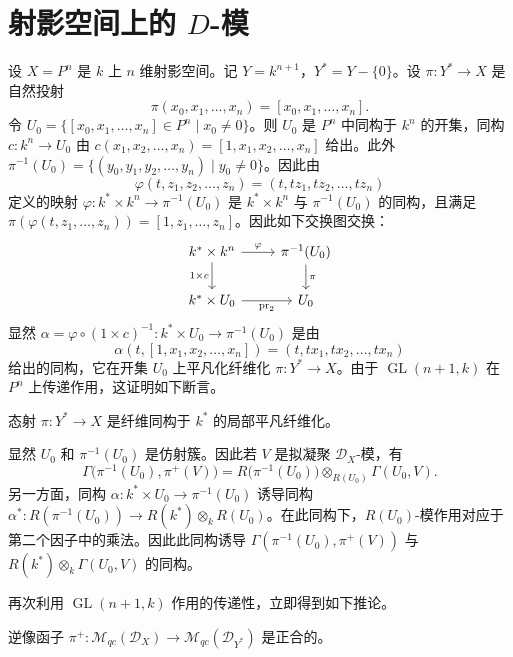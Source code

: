\section{射影空间上的 $D$-模}

设 $X=P^n$ 是 $k$ 上 $n$ 维射影空间。记 $Y=k^{n+1}$，$Y^*=Y-\{0\}$。设 $\pi:Y^*\to X$ 是自然投射
$$\pi(x_0,x_1,\dots,x_n)=[x_0,x_1,\dots,x_n].$$
令 $U_0=\{[x_0,x_1,\dots,x_n]\in P^n\mid x_0\neq 0\}$。则 $U_0$ 是 $P^n$ 中同构于 $k^n$ 的开集，同构 $c:k^n\to U_0$ 由 $c(x_1,x_2,\dots,x_n)=[1,x_1,x_2,\dots,x_n]$ 给出。此外 $\pi^{-1}(U_0)=\{(y_0,y_1,y_2,\dots,y_n)\mid y_0\neq 0\}$。因此由
$$\varphi(t,z_1,z_2,\dots,z_n)=(t,tz_1,tz_2,\dots,tz_n)$$
定义的映射 $\varphi:k^*\times k^n\to\pi^{-1}(U_0)$ 是 $k^*\times k^n$ 与 $\pi^{-1}(U_0)$ 的同构，且满足 $\pi(\varphi(t,z_1,\dots,z_n))=[1,z_1,\dots,z_n]$。因此如下交换图交换：
$$\begin{tikzcd}
k^*\times k^n \arrow[r,"\varphi"] \arrow[d,"1\times c"' ] & \pi^{-1}(U_0) \arrow[d,"\pi"]\\
k^*\times U_0 \arrow[r,"\operatorname{pr}_2"'] & U_0
\end{tikzcd}$$
显然 $\alpha=\varphi\circ(1\times c)^{-1}:k^*\times U_0\to\pi^{-1}(U_0)$ 是由
$$\alpha(t,[1,x_1,x_2,\dots,x_n])=(t,tx_1,tx_2,\dots,tx_n)$$
给出的同构，它在开集 $U_0$ 上平凡化纤维化 $\pi:Y^*\to X$。由于 $\operatorname{GL}(n+1,k)$ 在 $P^n$ 上传递作用，这证明如下断言。

\begin{lemma}
态射 $\pi:Y^*\to X$ 是纤维同构于 $k^*$ 的局部平凡纤维化。
\end{lemma}

显然 $U_0$ 和 $\pi^{-1}(U_0)$ 是仿射簇。因此若 $V$ 是拟凝聚 $\mathcal{D}_X$-模，有
$$\Gamma\bigl(\pi^{-1}(U_0),\pi^+(V)\bigr)=R\bigl(\pi^{-1}(U_0)\bigr)\otimes_{R(U_0)}\Gamma(U_0,V).$$
另一方面，同构 $\alpha:k^*\times U_0\to\pi^{-1}(U_0)$ 诱导同构 $\alpha^*:R(\pi^{-1}(U_0))\to R(k^*)\otimes_kR(U_0)$。在此同构下，$R(U_0)$-模作用对应于第二个因子中的乘法。因此此同构诱导 $\Gamma(\pi^{-1}(U_0),\pi^+(V))$ 与 $R(k^*)\otimes_k\Gamma(U_0,V)$ 的同构。

再次利用 $\operatorname{GL}(n+1,k)$ 作用的传递性，立即得到如下推论。

\begin{lemma}
逆像函子 $\pi^+:\mathcal{M}_{qc}(\mathcal{D}_X)\to\mathcal{M}_{qc}(\mathcal{D}_{Y^*})$ 是正合的。
\end{lemma}

